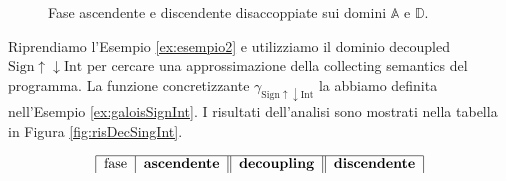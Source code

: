 \begin{figure}
    \centering
    \caption{Fase ascendente e discendente disaccoppiate sui domini \(\mathbb{A}\) e \(\mathbb{D}\).}
    \label{fig:decFig}
\end{figure}

\begin{example}
Riprendiamo l'Esempio \ref{ex:esempio2} e utilizziamo il dominio decoupled \(\textrm{Sign}\uparrow\downarrow\textrm{Int}\) per cercare una approssimazione della collecting semantics del programma. La funzione concretizzante \(\gamma_{\textrm{Sign}\uparrow\downarrow\textrm{Int}}\) la abbiamo definita nell'Esempio \ref{ex:galoisSignInt}. I risultati dell'analisi sono mostrati nella tabella in Figura \ref{fig:risDecSingInt}. 

\begin{table}
\begin{minipage}{\textwidth}
    \centering
    \vspace{1cm}
        \[
        \begin{tabular}{|c|c|c|c||c||c|c|c||}
        \hline
        \multicolumn{2}{|c|}{fase} & 
        \multicolumn{2}{c||}{\textbf{ascendente}} & 
        \multicolumn{1}{c||}{\textbf{decoupling}} & 
        \multicolumn{2}{c|}{\textbf{discendente}}\\
        

\end{tabular}\]
\end{minipage}
\end{table}
\end{example}
